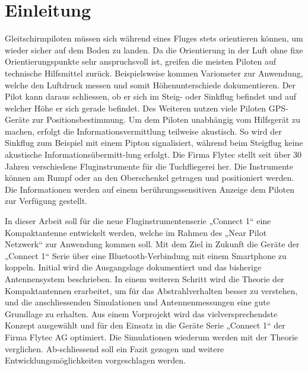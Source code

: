 \newpage
\section{Einleitung}
Gleitschirmpiloten müssen sich während eines Fluges stets orientieren können, um wieder sicher auf dem Boden zu landen. Da die Orientierung in der Luft ohne fixe Orientierungspunkte sehr anspruchsvoll ist, greifen die meisten Piloten auf technische Hilfsmittel zurück. Beispielsweise kommen Variometer zur Anwendung, welche den Luftdruck messen und somit Höhenunterschiede dokumentieren. Der Pilot kann daraus schliessen, ob er sich im Steig- oder Sinkflug befindet und auf welcher Höhe er sich gerade befindet. Des Weiteren nutzen viele Piloten GPS-Geräte zur Positionsbestimmung. Um dem Piloten unabhängig vom Hilfsgerät zu machen, erfolgt die Informationsvermittlung teilweise akustisch. So wird der Sinkflug zum Beispiel mit einem Pipton signalisiert, während beim Steigflug keine akustische Informationsübermitt-lung erfolgt. Die Firma Flytec stellt seit über 30 Jahren verschiedene Fluginstrumente für die Tuchfliegerei her. Die Instrumente können am Rumpf oder an den Oberschenkel getragen und positioniert werden. Die Informationen werden auf einem berührungssensitiven Anzeige dem Piloten zur Verfügung gestellt. 

In dieser Arbeit soll für die neue Fluginstrumentenserie „Connect 1“ eine Kompaktantenne entwickelt werden, welche im Rahmen des „Near Pilot Netzwerk“ zur Anwendung kommen soll. Mit dem Ziel in Zukunft die Geräte der „Connect 1“ Serie über eine Bluetooth-Verbindung mit einem Smartphone zu koppeln. Initial wird die Ausgangslage dokumentiert und das bisherige Antennensystem beschrieben. In einem weiteren Schritt wird die Theorie der Kompaktantennen erarbeitet, um für das Abstrahlverhalten besser zu verstehen, und die anschliessenden Simulationen und Antennenmessungen eine gute Grundlage zu erhalten. Aus einem Vorprojekt wird das vielversprechendste Konzept ausgewählt und für den Einsatz in die Geräte Serie „Connect 1“ der Firma Flytec AG optimiert. Die Simulationen wiederum werden mit der Theorie verglichen. Ab-schliessend soll ein Fazit gezogen und weitere Entwicklungsmöglichkeiten vorgeschlagen werden.


